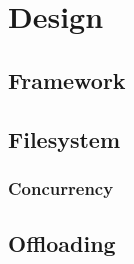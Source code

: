 
\chapter{Design} %



\ifpdf
    \graphicspath{{7/figures/PNG/}{7/figures/PDF/}{7/figures/}}
\else
    \graphicspath{{7/figures/EPS/}{7/figures/}}
\fi


% 

\section{Framework}


\section{Filesystem}


\subsection{Concurrency}

\section{Offloading}


